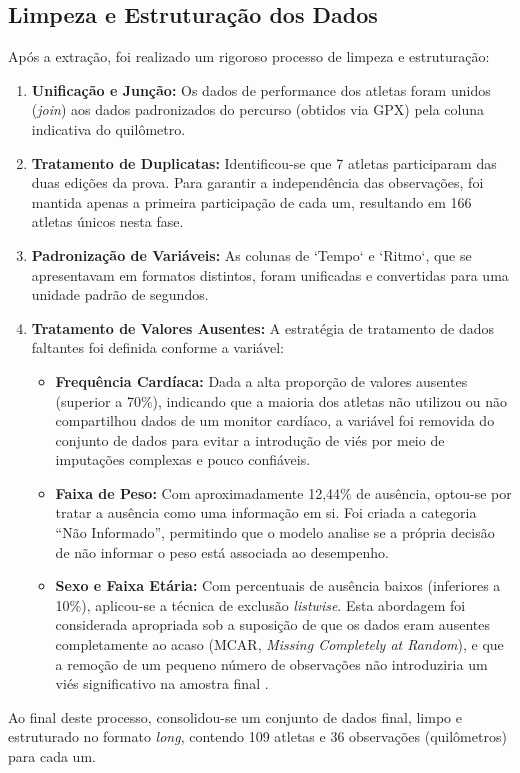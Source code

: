 \subsection{Limpeza e Estruturação dos Dados}
\label{subsec:limpeza}

Após a extração, foi realizado um rigoroso processo de limpeza e estruturação:
\begin{enumerate}
    \item \textbf{Unificação e Junção:} Os dados de performance dos atletas foram unidos (\emph{join}) aos dados padronizados do percurso (obtidos via GPX) pela coluna indicativa do quilômetro.
    
    \item \textbf{Tratamento de Duplicatas:} Identificou-se que 7 atletas participaram das duas edições da prova. Para garantir a independência das observações, foi mantida apenas a primeira participação de cada um, resultando em 166 atletas únicos nesta fase.
    
    \item \textbf{Padronização de Variáveis:} As colunas de `Tempo` e `Ritmo`, que se apresentavam em formatos distintos, foram unificadas e convertidas para uma unidade padrão de segundos.
    
    \item \textbf{Tratamento de Valores Ausentes:} A estratégia de tratamento de dados faltantes foi definida conforme a variável:
    \begin{itemize}
        \item \textbf{Frequência Cardíaca:} Dada a alta proporção de valores ausentes (superior a 70\%), indicando que a maioria dos atletas não utilizou ou não compartilhou dados de um monitor cardíaco, a variável foi removida do conjunto de dados para evitar a introdução de viés por meio de imputações complexas e pouco confiáveis.
        \item \textbf{Faixa de Peso:} Com aproximadamente 12,44\% de ausência, optou-se por tratar a ausência como uma informação em si. Foi criada a categoria ``Não Informado'', permitindo que o modelo analise se a própria decisão de não informar o peso está associada ao desempenho.
        \item \textbf{Sexo e Faixa Etária:} Com percentuais de ausência baixos (inferiores a 10\%), aplicou-se a técnica de exclusão \textit{listwise}. Esta abordagem foi considerada apropriada sob a suposição de que os dados eram ausentes completamente ao acaso (MCAR, \textit{Missing Completely at Random}), e que a remoção de um pequeno número de observações não introduziria um viés significativo na amostra final \cite[para uma discussão, ver][]{rubin1976}.
    \end{itemize}
\end{enumerate}
Ao final deste processo, consolidou-se um conjunto de dados final, limpo e estruturado no formato \emph{long}, contendo 109 atletas e 36 observações (quilômetros) para cada um.

